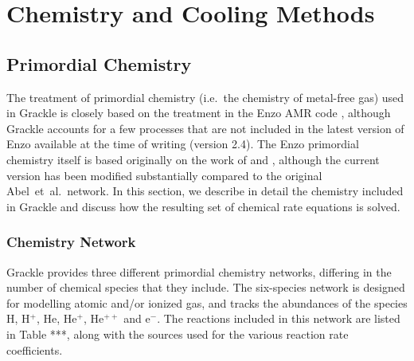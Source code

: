 \section{Chemistry and Cooling Methods} \label{sec:physics}



\subsection{Primordial Chemistry}
The treatment of primordial chemistry (i.e.\ the chemistry of metal-free gas) used in Grackle is closely based on the
treatment in the Enzo AMR code \citep{2014ApJS..211...19B}, although Grackle accounts for a few processes that are not included 
in the latest version of Enzo available at the time of writing (version 2.4). The Enzo primordial chemistry itself is based 
originally on the work of \citet{1997NewA....2..181A} and \citet{1997NewA....2..209A}, although the current version has been
modified substantially compared to the original Abel~et~al.\ network. In this section, we describe in detail the chemistry 
included in Grackle and discuss how the resulting set of chemical rate equations is solved. 

\subsubsection{Chemistry Network}
Grackle provides three different primordial chemistry networks, differing in the number of chemical species that they include. 
The six-species network is designed for modelling atomic and/or ionized gas, and tracks the abundances of the species
H, H$^{+}$, He, He$^{+}$, He$^{++}$ and e$^{-}$. The reactions included in this network are listed in Table ***, along with
the sources used for the various reaction rate coefficients. 

